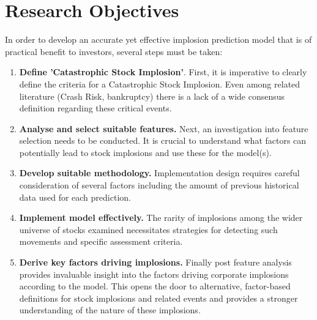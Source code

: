 \documentclass[a4paper]{report}
\begin{document}
\section{Research Objectives}
In order to develop an accurate yet effective implosion prediction model that is of practical benefit to investors, several steps must be taken:
\begin{enumerate}
  \item { \bfseries Define 'Catastrophic Stock Implosion'}. First, it is imperative to clearly define the criteria for a Catastrophic Stock Implosion. Even among related literature (Crash Risk, bankruptcy) there is a lack of a wide consensus definition regarding these critical events.
  \item { \bfseries Analyse and select suitable features.} Next, an investigation into feature selection needs to be conducted. It is crucial to understand what factors can potentially lead to stock implosions and use these for the model(s).
  \item { \bfseries Develop suitable methodology.} Implementation design requires careful consideration of several factors including the amount of previous historical data used for each prediction.
  \item { \bfseries Implement model effectively.} The rarity of implosions among the wider universe of stocks examined necessitates strategies for detecting such movements and specific assessment criteria.
  \item { \bfseries Derive key factors driving implosions.} Finally post feature analysis provides invaluable insight into the factors driving corporate implosions according to the model. This opens the door to alternative, factor-based definitions for stock implosions and related events
  and provides a stronger understanding of the nature of these implosions.
\end{enumerate}
\end{document}
